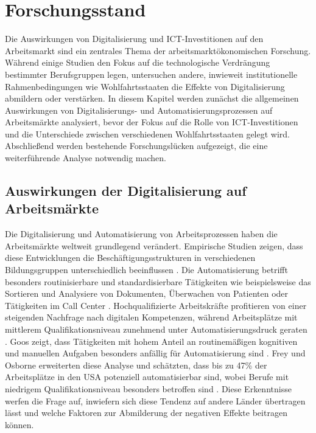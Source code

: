 
\section{Forschungsstand}

Die Auswirkungen von Digitalisierung und \ac{ICT}-Investitionen auf den Arbeitsmarkt sind ein 
zentrales Thema der arbeitsmarktökonomischen Forschung. Während einige Studien den Fokus auf die 
technologische Verdrängung bestimmter Berufsgruppen legen, untersuchen andere, inwieweit 
institutionelle Rahmenbedingungen wie Wohlfahrtsstaaten die Effekte von Digitalisierung abmildern 
oder verstärken. In diesem Kapitel werden zunächst die allgemeinen Auswirkungen von 
Digitalisierungs- und Automatisierungsprozessen auf Arbeitsmärkte analysiert, bevor der Fokus auf 
die Rolle von \ac{ICT}-Investitionen und die Unterschiede zwischen verschiedenen 
Wohlfahrtsstaaten gelegt wird. Abschließend werden bestehende Forschungslücken aufgezeigt, die 
eine weiterführende Analyse notwendig machen.


\subsection{Auswirkungen der Digitalisierung auf Arbeitsmärkte}

Die Digitalisierung und Automatisierung von Arbeitsprozessen haben die Arbeitsmärkte weltweit 
grundlegend verändert. Empirische Studien zeigen, dass diese Entwicklungen die 
Beschäftigungsstrukturen in verschiedenen Bildungsgruppen unterschiedlich beeinflussen 
\parencite[vgl.][S. 1588-1590]{autor2013thegrowth}. Die Automatisierung betrifft besonders 
routinisierbare und standardisierbare Tätigkeiten wie beispielsweise das Sortieren und Analysiere 
von Dokumenten, Überwachen von Patienten oder Tätigkeiten im Call Center 
\parencite[vgl.][S. 19-20]{frey2013thefuture}. Hochqualifizierte Arbeitskräfte profitieren von 
einer steigenden Nachfrage nach digitalen Kompetenzen, während Arbeitsplätze mit mittlerem 
Qualifikationsniveau zunehmend unter Automatisierungsdruck geraten 
\parencite[vgl.][S. 2509–2510]{goos2014explaining}. Goos zeigt, dass Tätigkeiten mit hohem Anteil 
an routinemäßigen kognitiven und manuellen Aufgaben besonders anfällig für Automatisierung sind 
\parencite[vgl.][S. 2521]{goos2014explaining}. Frey und Osborne erweiterten diese Analyse und 
schätzten, dass bis zu 47\% der Arbeitsplätze in den USA potenziell automatisierbar sind, wobei 
Berufe mit niedrigem Qualifikationsniveau besonders betroffen sind 
\parencite[S. 39-41]{frey2013thefuture}. Diese Erkenntnisse  werfen die Frage auf, inwiefern sich 
diese Tendenz auf andere Länder übertragen lässt und welche Faktoren zur Abmilderung der 
negativen Effekte beitragen können. 

